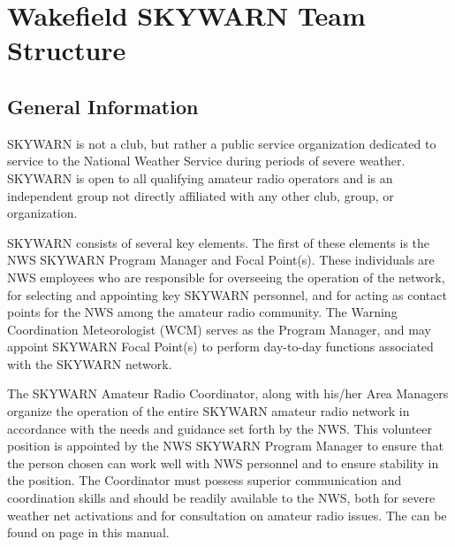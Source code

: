 \documentclass[pdflatex,letterpaper,twoside,12pt]{book}
\begin{document}

\chapter{Wakefield SKYWARN Team Structure}


\section{General Information}

SKYWARN is not a club, but rather a public service organization dedicated to service to the National Weather Service during periods of severe weather. SKYWARN is open to all qualifying amateur radio operators and is an independent group not directly affiliated with any other club, group, or organization.

SKYWARN consists of several key elements.  The first of these elements is the NWS SKYWARN Program Manager and Focal Point(s).  These individuals are NWS employees who are responsible for overseeing the operation of the network, for selecting and appointing key SKYWARN personnel, and for acting as contact points for the NWS among the amateur radio community.  The Warning Coordination Meteorologist (WCM) serves as the Program Manager, and may appoint SKYWARN Focal Point(s) to perform day-to-day functions associated with the SKYWARN network.

The SKYWARN Amateur Radio Coordinator, along with his/her Area Managers organize the operation of the entire SKYWARN amateur radio network in accordance with the needs and guidance set forth by the NWS.  This volunteer position is appointed by the NWS SKYWARN Program Manager to ensure that the person chosen can work well with NWS personnel and to ensure stability in the position.  The Coordinator must possess superior communication and coordination skills and should be readily available to the NWS, both for severe weather net activations and for consultation on amateur radio issues.  The  can be found on page \pageref{arc-jobdesc} in this manual.
\end{document}
